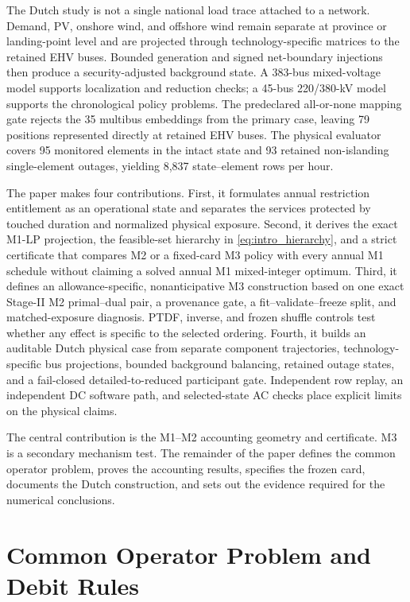 \documentclass[10pt,journal]{IEEEtran}
\begin{document}
The Dutch study is not a single national load trace attached to a network. Demand, PV, onshore wind, and offshore wind remain separate at province or landing-point level and are projected through technology-specific matrices to the retained EHV buses. Bounded generation and signed net-boundary injections then produce a security-adjusted background state. A 383-bus mixed-voltage model supports localization and reduction checks; a 45-bus 220/380-kV model supports the chronological policy problems. The predeclared all-or-none mapping gate rejects the 35 multibus embeddings from the primary case, leaving 79 positions represented directly at retained EHV buses. The physical evaluator covers 95 monitored elements in the intact state and 93 retained non-islanding single-element outages, yielding 8,837 state--element rows per hour.

The paper makes four contributions. First, it formulates annual restriction entitlement as an operational state and separates the services protected by touched duration and normalized physical exposure. Second, it derives the exact M1-LP projection, the feasible-set hierarchy in \eqref{eq:intro_hierarchy}, and a strict certificate that compares M2 or a fixed-card M3 policy with every annual M1 schedule without claiming a solved annual M1 mixed-integer optimum. Third, it defines an allowance-specific, nonanticipative M3 construction based on one exact Stage-II M2 primal--dual pair, a provenance gate, a fit--validate--freeze split, and matched-exposure diagnosis. PTDF, inverse, and frozen shuffle controls test whether any effect is specific to the selected ordering. Fourth, it builds an auditable Dutch physical case from separate component trajectories, technology-specific bus projections, bounded background balancing, retained outage states, and a fail-closed detailed-to-reduced participant gate. Independent row replay, an independent DC software path, and selected-state AC checks place explicit limits on the physical claims.

The central contribution is the M1--M2 accounting geometry and certificate. M3 is a secondary mechanism test. The remainder of the paper defines the common operator problem, proves the accounting results, specifies the frozen card, documents the Dutch construction, and sets out the evidence required for the numerical conclusions.

\section{Common Operator Problem and Debit Rules}
\label{sec:model}
\end{document}
